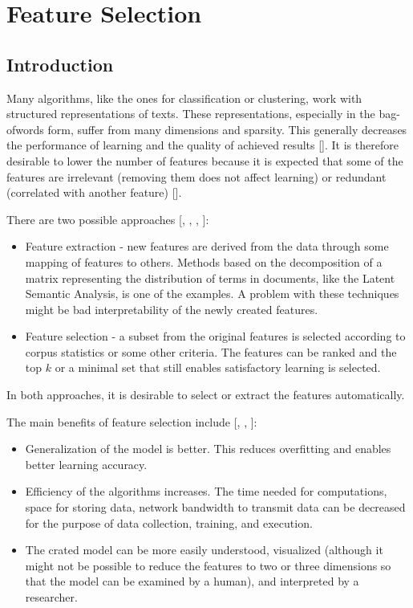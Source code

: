 \chapter{Feature Selection}
\section{Introduction}
Many algorithms, like the ones for classification or clustering, work with structured representations of texts. These representations, especially in the bag-ofwords form, suffer from many dimensions and sparsity. This generally decreases the performance of learning and the quality of achieved results [\cite{ref145}]. It is therefore desirable to lower the number of features because it is expected that some of the features are irrelevant (removing them does not affect learning) or redundant (correlated with another feature) [\cite{ref175}].

There are two possible approaches [\cite{ref179}, \cite{ref286}, \cite{ref159}, \cite{ref175}]:

\begin{itemize}
  \item Feature extraction - new features are derived from the data through some mapping of features to others. Methods based on the decomposition of a matrix representing the distribution of terms in documents, like the Latent Semantic Analysis, is one of the examples. A problem with these techniques might be bad interpretability of the newly created features.
  \item Feature selection - a subset from the original features is selected according to corpus statistics or some other criteria. The features can be ranked and the top $k$ or a minimal set that still enables satisfactory learning is selected.
\end{itemize}

In both approaches, it is desirable to select or extract the features automatically.

The main benefits of feature selection include [\cite{ref69}, \cite{ref201}, \cite{ref92}]:

\begin{itemize}
  \item Generalization of the model is better. This reduces overfitting and enables better learning accuracy.
  \item Efficiency of the algorithms increases. The time needed for computations, space for storing data, network bandwidth to transmit data can be decreased for the purpose of data collection, training, and execution.
  \item The crated model can be more easily understood, visualized (although it might not be possible to reduce the features to two or three dimensions so that the model can be examined by a human), and interpreted by a researcher.
\end{itemize}

